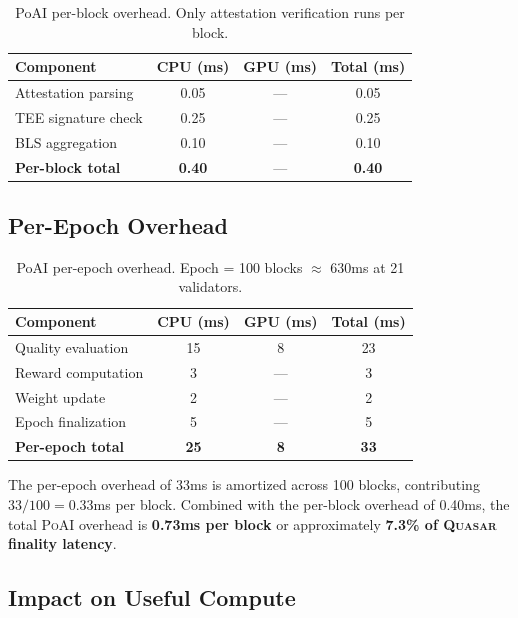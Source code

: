 \documentclass[11pt,letterpaper]{article}
\newcommand{\PoAI}{\textsc{PoAI}}
\newcommand{\Quasar}{\textsc{Quasar}}
\begin{document}
\begin{table}[t]
\centering
\begin{tabular}{lccc}
\toprule
\textbf{Component} & \textbf{CPU (ms)} & \textbf{GPU (ms)} & \textbf{Total (ms)} \\
\midrule
Attestation parsing & 0.05 & --- & 0.05 \\
TEE signature check & 0.25 & --- & 0.25 \\
BLS aggregation & 0.10 & --- & 0.10 \\
\midrule
\textbf{Per-block total} & \textbf{0.40} & --- & \textbf{0.40} \\
\bottomrule
\end{tabular}
\caption{PoAI per-block overhead. Only attestation verification runs per block.}
\label{tab:per-block}
\end{table}

\subsection{Per-Epoch Overhead}

\begin{table}[t]
\centering
\begin{tabular}{lccc}
\toprule
\textbf{Component} & \textbf{CPU (ms)} & \textbf{GPU (ms)} & \textbf{Total (ms)} \\
\midrule
Quality evaluation & 15 & 8 & 23 \\
Reward computation & 3 & --- & 3 \\
Weight update & 2 & --- & 2 \\
Epoch finalization & 5 & --- & 5 \\
\midrule
\textbf{Per-epoch total} & \textbf{25} & \textbf{8} & \textbf{33} \\
\bottomrule
\end{tabular}
\caption{PoAI per-epoch overhead. Epoch = 100 blocks $\approx$ 630ms at 21 validators.}
\label{tab:per-epoch}
\end{table}

The per-epoch overhead of 33ms is amortized across 100 blocks, contributing $33/100 = 0.33$ms per block. Combined with the per-block overhead of 0.40ms, the total \PoAI{} overhead is \textbf{0.73ms per block} or approximately \textbf{7.3\% of \Quasar{} finality latency}.

\subsection{Impact on Useful Compute}
\end{document}

